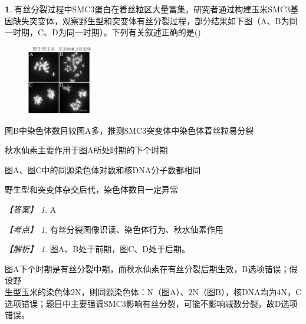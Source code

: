 \documentclass[UTF8, 10pt, a4paper, oneside]{ctexart}
\theoremstyle{definition}
\newtheorem{exercise}{}
\theoremstyle{remark}
\newtheorem*{answer}{【答案】}
\newtheorem*{point}{【考点】}      %
\newtheorem*{explanation}{【解析】}     %
\theoremstyle{plain}
\begin{document}
\begin{exercise}
    有丝分裂过程中SMC3蛋白在着丝粒区大量富集。研究者通过构建玉米SMC3基因缺失突变体，观察野生型和突变体有丝分裂过程，部分结果如下图（A、B为同一时期，C、D为同一时期）。下列有关叙述正确的是\quad(\quad)
    \begin{figure}[h!]
        \flushright
        \includegraphics[width=0.25\textwidth]{assists/8-1.jpg}
    \end{figure}\vspace{-16em}
    \begin{adjustwidth}{2em}{}
        \begin{asparaenum}[A. ]
            \item 图B中染色体数目较图A多，推测SMC3突变体中染色体着丝粒易分裂
            \item 秋水仙素主要作用于图A所处时期的下个时期
            \item 图A、图C中的同源染色体对数和核DNA分子数都相同
            \item 野生型和突变体杂交后代，染色体数目一定异常
        \end{asparaenum}
    \end{adjustwidth}
    \begin{answer}
        A
    \end{answer}
    \begin{point}
        有丝分裂图像识读、染色体行为、秋水仙素作用
    \end{point}
    \begin{explanation}
        图A、B处于前期，图C、D处于后期。

        \noindent 图A下个时期是有丝分裂中期，而秋水仙素在有丝分裂后期生效，B选项错误；假设野\\生型玉米的染色体2N，则同源染色体：N（图A）、2N（图B），核DNA均为4N，C选项错误；题目中主要强调SMC3影响有丝分裂，可能不影响减数分裂，故D选项错误。
    \end{explanation}
\end{exercise}
\end{document}
